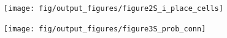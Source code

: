 \documentclass[a4paper,12pt]{article}
\newcommand{\ssc}[3]{\ensuremath{#1_{\text{#2}_{\text{#3}}}}}
\newcommand{\gE      }{\ssc{g}      {\scriptsize{E}}{}}
\newcommand{\gI      }{\ssc{g}      {\scriptsize{I}}{}}
\begin{document}
{\begin{figure}[p]
    \internallinenumbers
    \centering
        \texttt{[image: fig/output\_figures/figure2S\_i\_place\_cells]}
    \caption{}
\end{figure}

\clearpage

%

\setcounter{figure}{0}
\renewcommand{\figurename}{Figure 3 - figure supplement}

\begin{figure}[p]
    \internallinenumbers
    \centering
        \texttt{[image: fig/output\_figures/figure3S\_prob\_conn]}
    \caption{}
\end{figure}

\clearpage

%

}
\end{document}
